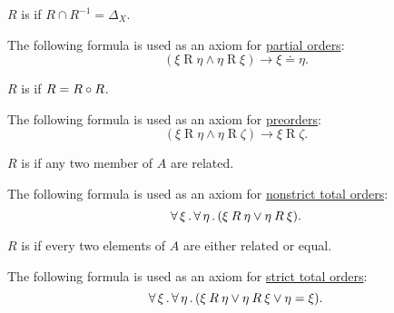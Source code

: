 \begin{definition}
\begin{thmenum}[resume=def:binary_relation]
     \( R \) is  if \( R \cap R^{-1} = \Delta_X \).

    The following formula is used as an axiom for \hyperref[def:poset]{partial orders}:
    \begin{equation}\label{eq:def:binary_relation/antisymmetric}
      (\xi \mathbin{R} \eta \wedge \eta \mathbin{R} \xi) \rightarrow \xi \doteq \eta.
    \end{equation}

     \( R \) is  if \( R = R \mathbin \circ R \).

    The following formula is used as an axiom for \hyperref[def:poset]{preorders}:
    \begin{equation}\label{eq:def:binary_relation/transitive}
      (\xi \mathbin{R} \eta \wedge \eta \mathbin{R} \zeta) \rightarrow \xi \mathbin{R} \zeta.
    \end{equation}

     \( R \) is  if any two member of \( A \) are related.

    The following formula is used as an axiom for \hyperref[def:totally_ordered_set]{nonstrict total orders}:
    \begin{equation}\label{eq:def:binary_relation/total}
      \forall \thinspace \xi \thinspace . \thinspace \forall \thinspace \eta \thinspace . \thinspace (\xi \mathbin{R} \eta \vee \eta \mathbin{R} \xi).
    \end{equation}

     \( R \) is  if every two elements of \( A \) are either related or equal.

    The following formula is used as an axiom for \hyperref[def:totally_ordered_set]{strict total orders}:
    \begin{equation}\label{eq:def:binary_relation/trichotomic}
      \forall \thinspace \xi \thinspace . \thinspace \forall \thinspace \eta \thinspace . \thinspace (\xi \mathbin{R} \eta \vee \eta \mathbin{R} \xi \vee \eta = \xi).
    \end{equation}
  \end{thmenum}
\end{definition}

